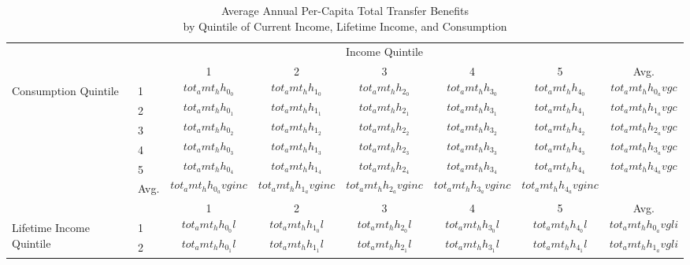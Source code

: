 \begin{table}[t]
\small
 \caption{Average Annual Per-Capita Total Transfer Benefits \\ by Quintile of Current Income, Lifetime Income, and Consumption}
 \label{tab:quintile_avgben}
\begin{tabular*}{\textwidth}{@{\extracolsep{\fill}}llcccccc@{}}
\toprule
                                      &   & \multicolumn{5}{c}{Income Quintile}                                                                    \\ \cmidrule{3-8}
                                      &   & 1                  & 2                  & 3                  & 4                  & 5        & Avg.            \\ \cmidrule{3-8}
\multirow{5}{*}{Consumption Quintile} & 1 & $$tot_amt_hh_0_0$$ & $$tot_amt_hh_1_0$$ & $$tot_amt_hh_2_0$$ & $$tot_amt_hh_3_0$$ & $$tot_amt_hh_4_0$$ & $$tot_amt_hh_0_avgc$$ \\
                                      & 2 & $$tot_amt_hh_0_1$$ & $$tot_amt_hh_1_1$$ & $$tot_amt_hh_2_1$$ & $$tot_amt_hh_3_1$$ & $$tot_amt_hh_4_1$$ & $$tot_amt_hh_1_avgc$$ \\
                                      & 3 & $$tot_amt_hh_0_2$$ & $$tot_amt_hh_1_2$$ & $$tot_amt_hh_2_2$$ & $$tot_amt_hh_3_2$$ & $$tot_amt_hh_4_2$$ & $$tot_amt_hh_2_avgc$$ \\
                                      & 4 & $$tot_amt_hh_0_3$$ & $$tot_amt_hh_1_3$$ & $$tot_amt_hh_2_3$$ & $$tot_amt_hh_3_3$$ & $$tot_amt_hh_4_3$$ & $$tot_amt_hh_3_avgc$$ \\
                                      & 5 & $$tot_amt_hh_0_4$$ & $$tot_amt_hh_1_4$$ & $$tot_amt_hh_2_4$$ & $$tot_amt_hh_3_4$$ & $$tot_amt_hh_4_4$$ & $$tot_amt_hh_4_avgc$$ \\
                                      & Avg. & $$tot_amt_hh_0_avginc$$ & $$tot_amt_hh_1_avginc$$ & $$tot_amt_hh_2_avginc$$ & $$tot_amt_hh_3_avginc$$ & $$tot_amt_hh_4_avginc$$ \\ \midrule
                                        &   & 1                  & 2                  & 3                  & 4                  & 5       & Avg.           \\ \cmidrule{3-8}
\multirow{5}{*}{Lifetime Income Quintile} & 1 & $$tot_amt_hh_0_0l$$ & $$tot_amt_hh_1_0l$$ & $$tot_amt_hh_2_0l$$ & $$tot_amt_hh_3_0l$$ & $$tot_amt_hh_4_0l$$ & $$tot_amt_hh_0_avgli$$ \\
                                      & 2 & $$tot_amt_hh_0_1l$$ & $$tot_amt_hh_1_1l$$ & $$tot_amt_hh_2_1l$$ & $$tot_amt_hh_3_1l$$ & $$tot_amt_hh_4_1l$$ & $$tot_amt_hh_1_avgli$$ \\

\end{tabular*}
\end{table}
